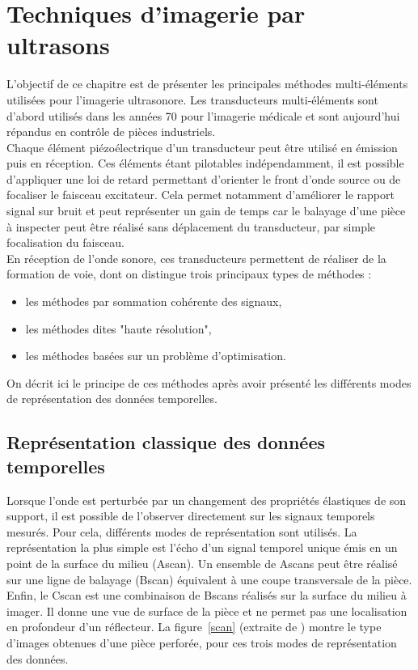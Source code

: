 \chapter{Techniques d'imagerie par ultrasons}


 L'objectif de ce chapitre est de présenter les principales méthodes multi-éléments utilisées pour l'imagerie ultrasonore. Les transducteurs multi-éléments sont d'abord utilisés dans les années 70 pour l'imagerie médicale et sont aujourd'hui répandus en contrôle de pièces industriels.\\

Chaque élément piézoélectrique d'un transducteur peut être utilisé en émission puis en réception. Ces éléments étant pilotables indépendamment, il est possible d'appliquer une loi de retard permettant d'orienter le front d'onde source ou de focaliser le faisceau excitateur. Cela permet notamment d'améliorer le rapport signal sur bruit et peut représenter un gain de temps car le balayage d'une pièce à inspecter peut être réalisé sans déplacement du transducteur, par simple focalisation du faisceau.\\

En réception de l'onde sonore, ces transducteurs permettent de réaliser de la formation de voie, dont on distingue trois principaux types de méthodes : 
\begin{itemize}
	\item les méthodes par sommation cohérente des signaux,
	\item les méthodes dites "haute résolution",
	\item les méthodes basées sur un problème d'optimisation.
\end{itemize} 

On décrit ici le principe de ces méthodes après avoir présenté les différents modes de représentation des données temporelles.




\section{Représentation classique des données temporelles}

Lorsque l'onde est perturbée par un changement des propriétés élastiques de son support, il est possible de l'observer directement sur les signaux temporels mesurés. Pour cela, différents modes de représentation sont utilisés. La représentation la plus simple est l’écho d’un signal temporel unique émis en un point de la surface du milieu (Ascan). Un ensemble de Ascans peut être réalisé sur une ligne de balayage (Bscan) équivalent à une coupe transversale de la pièce. Enfin, le Cscan est une combinaison de Bscans réalisés sur la surface du milieu à imager. Il donne une vue de surface de la pièce et ne permet pas une localisation en profondeur d'un réflecteur. La figure~\ref{scan} (extraite de \cite{bannouf}) montre le type d'images obtenues d'une pièce perforée, pour ces trois modes de représentation des données. \\
 
